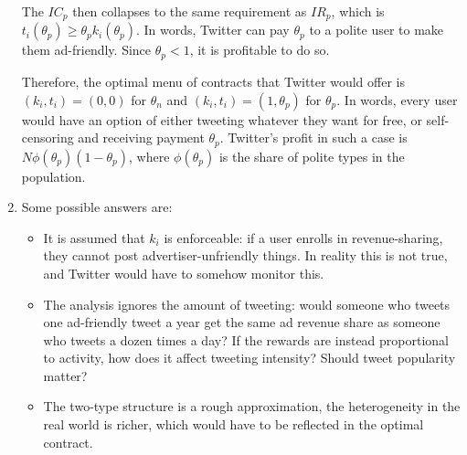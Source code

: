 \documentclass[a4paper]{article}
\newif\ifsolutions
\begin{document}
\begin{enumerate}
	The $IC_p$ then collapses to the same requirement as $IR_p$, which is $t_i(\theta_p) \geq \theta_p k_i(\theta_p)$. In words, Twitter can pay $\theta_p$ to a polite user to make them ad-friendly. Since $\theta_p < 1$, it is profitable to do so. 
	
	Therefore, the optimal menu of contracts that Twitter would offer is $(k_i,t_i) = (0,0)$ for $\theta_n$ and $(k_i,t_i) = (1,\theta_p)$ for $\theta_p$. In words, every user would have an option of either tweeting whatever they want for free, or self-censoring and receiving payment $\theta_p$. Twitter's profit in such a case is $N \phi(\theta_p) (1-\theta_p)$, where $\phi(\theta_p)$ is the share of polite types in the population.
	
	\item Some possible answers are:
	\begin{itemize}
		\item It is assumed that $k_i$ is enforceable: if a user enrolls in revenue-sharing, they cannot post advertiser-unfriendly things. In reality this is not true, and Twitter would have to somehow monitor this.
		
		\item The analysis ignores the amount of tweeting: would someone who tweets one ad-friendly tweet a year get the same ad revenue share as someone who tweets a dozen times a day? If the rewards are instead proportional to activity, how does it affect tweeting intensity? Should tweet popularity matter?
		
		\item The two-type structure is a rough approximation, the heterogeneity in the real world is richer, which would have to be reflected in the optimal contract.
	\end{itemize}
\end{enumerate}
\fi




%
%
%
\end{document}
